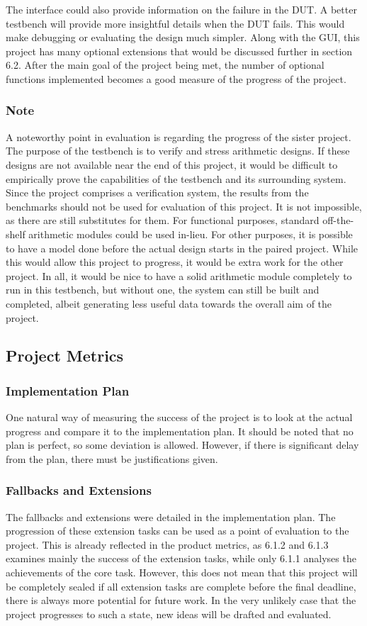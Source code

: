 The interface could also provide information on the failure in the DUT.
A better testbench will provide more insightful details when the DUT fails.
This would make debugging or evaluating the design much simpler.
Along with the GUI, this project has many optional extensions that would be
discussed further in section 6.2.
After the main goal of the project being met, the number of optional functions
implemented becomes a good measure of the progress of the project.

\subsubsection{Note}
A noteworthy point in evaluation is regarding the progress of the sister project.
The purpose of the testbench is to verify and stress arithmetic designs.
If these designs are not available near the end of this project,
it would be difficult to empirically prove the capabilities of the testbench
and its surrounding system.
Since the project comprises a verification system, the results from the
benchmarks should not be used for evaluation of this project.
It is not impossible, as there are still substitutes for them.
For functional purposes, standard off-the-shelf arithmetic modules could be
used in-lieu.
For other purposes, it is possible to have a model done before the actual design
starts in the paired project.
While this would allow this project to progress, it would be extra work
for the other project.
In all, it would be nice to have a solid arithmetic module completely to run
in this testbench, but without one, the system can still be built and completed,
albeit generating less useful data towards the overall aim of the project.

\subsection{Project Metrics}
\subsubsection{Implementation Plan}
One natural way of measuring the success of the project is to look at the actual
progress and compare it to the implementation plan.
It should be noted that no plan is perfect, so some deviation is allowed.
However, if there is significant delay from the plan, there must be
justifications given.

\subsubsection{Fallbacks and Extensions}
The fallbacks and extensions were detailed in the implementation plan.
The progression of these extension tasks can be used as a point of evaluation
to the project.
This is already reflected in the product metrics, as 6.1.2 and 6.1.3 examines
mainly the success of the extension tasks, while only 6.1.1 analyses the
achievements of the core task.
However, this does not mean that this project will be completely sealed if
all extension tasks are complete before the final deadline, there is always
more potential for future work.
In the very unlikely case that the project progresses to such a state, new ideas
will be drafted and evaluated.
